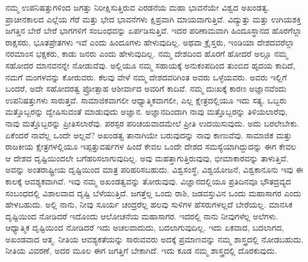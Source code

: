 ನಮ್ಮ ಉಪನಿಷತ್ತುಗಳಿಂದ ಜಗತ್ತು ನಿರೀಕ್ಷಿಸುತ್ತಿರುವ ಎರಡನೆಯ ಮಹಾ ಭಾವನೆಯೇ ವಿಶ್ವದ ಅಖಂಡತ್ವ. ಪ್ರಾಚೀನಕಾಲದ ಎಲ್ಲೆಯ ಗೆರೆ ಮತ್ತು ಭೇದ ಭಾವನೆಗಳು ಕ್ಷಿಪ್ರವಾಗಿ ಮಾಯವಾಗುತ್ತಿವೆ. ವಿದ್ಯುತ್ತು ಮತ್ತು ಉಗಿಯಶಕ್ತಿ ಜಗತ್ತಿನ ಬೇರೆ ಬೇರೆ ಭಾಗಗಳಿಗೆ ಸಂಬಂಧವನ್ನು ಏರ್ಪಡಿಸುತ್ತಿವೆ. ಇದರ ಪರಿಣಾಮವಾಗಿ ಹಿಂದೂಸ್ಥಾನದ ಹೊರಗೆಲ್ಲಾ ರಾಕ್ಷಸರು, ಭೂತಪ್ರೇತಗಳು ಇವೆ ಎಂದು ಹಿಂದೂಗಳು ಹೇಳುವುದಿಲ್ಲ. ಅಥವಾ ಕ್ರೈಸ್ತರು, ಇಂಡಿಯಾ ದೇಶದವರೆಲ್ಲಾ ನರಮಾಂಸ ಭಕ್ಷಕರು, ಕಾಡು ಜನರು ಎಂದು ಹೇಳುವುದಿಲ್ಲ. ನಮ್ಮ ದೇಶದಿಂದ ಹೊರಗೆ ಹೋದರೆ ಅಲ್ಲೂ ನಮ್ಮ ಸಹೋದರ ಮಾನವನನ್ನೇ ನೋಡುವೆವು. ಅಲ್ಲಿಯೂ ನಮ್ಮ ಸಹಾಯಕ್ಕೆ ಅನುಕಂಪದಿಂದ ತುಂಬಿದ ಹೃದಯ ಕಾದಿದೆ, ನಮಗೆ ಮಂಗಳವನ್ನು ಕೋರುವರು. ಕೆಲವು ವೇಳೆ ನಮ್ಮ ದೇಶದವರಿಗಿಂತ ಅವರು ಒಳ್ಳೆಯವರು. ಅವರು ಇಲ್ಲಿಗೆ ಬಂದರೆ, ಅದೇ ಸಹೋದರತ್ವ ಪ್ರೋತ್ಸಾಹ ಆಶೀರ್ವಾದ ಅವರಿಗೆ ಕಾದಿವೆ. ನಮ್ಮ ದುಃಖಕ್ಕೆ ಕಾರಣ ಅಜ್ಞಾನವೆಂದು ಉಪನಿಷತ್ತುಗಳು ಸಾರುತ್ತವೆ. ಸಾಮಾಜಿಕವಾಗಲೀ ಆಧ್ಯಾತ್ಮಿಕವಾಗಲೀ, ಎಲ್ಲ ಕ್ಷೇತ್ರದಲ್ಲಿಯೂ ಇದು ಸತ್ಯ. ಒಬ್ಬರು ಮತ್ತೊಬ್ಬರನ್ನು ದ್ವೇಷಿಸುವಂತೆ ಮಾಡುವುದು ಅಜ್ಞಾನ. ಅಜ್ಞಾನದಿಂದಾಗಿ ನಾವು ಮತ್ತೊಬ್ಬರನ್ನು ತಿಳಿಯಲಾರೆವು, ನಾವು ಮತ್ತೊಬ್ಬರನ್ನು ಪ್ರೀತಿಸಲಾರೆವು. ಪರಸ್ಪರ ಪರಿಚಯವಾದಮೇಲೆ ಪ್ರೀತಿ ಉದಯಿಸುವುದು. ಅದು ಬರಲೇಬೇಕು. ಏಕೆಂದರೆ ನಾವೆಲ್ಲ ಒಂದೇ ಅಲ್ಲವೆ? ಅಖಂಡತ್ವ ತಾನಾಗಿಯೇ ಬರುವುದನ್ನು ನಾವು ಕಾಣುವೆವು. ಸಾಮಾಜಿಕ ಮತ್ತು ರಾಜಕೀಯ ಕ್ಷೇತ್ರಗಳಲ್ಲಿಯೂ ಇಪ್ಪತ್ತು\break ವರ್ಷಗಳ ಹಿಂದೆ ಕೇವಲ ಒಂದೇ ದೇಶದ ಸಮಸ್ಯೆಯಾಗಿದ್ದುದನ್ನು ಈಗ ಕೇವಲ ಆ ದೇಶದ ದೃಷ್ಟಿಯಿಂದಲೇ ಬಗೆಹರಿಸಲಾಗುವುದಿಲ್ಲ. ಅವು ಮಹತ್ತಾಗುತ್ತಿರುವುವು, ಭೀಮಾಕಾರವನ್ನು ತಾಳುತ್ತಿವೆ. ಅವನ್ನು ಅಂತರಾಷ್ಟ್ರೀಯ ದೃಷ್ಟಿಯಿಂದ ಮಾತ್ರ ಪರಿಹರಿಸಬಹುದು. ವಿಶ್ವಸಂಸ್ಥೆ, ವಿಶ್ವಯೋಜನೆ, ವಿಶ್ವಕಾನೂನು ಇವು ಈ ಕಾಲಕ್ಕೆ ಆವಶ್ಯಕವಾಗಿವೆ. ಇವು ನಮ್ಮ ಅಖಂಡತ್ವವನ್ನು ತೋರುವುವು. ವಿಜ್ಞಾನದಲ್ಲಿಯೂ ಪ್ರತಿದಿನವೂ ಭೌತದ್ರವ್ಯದ ಸಂಬಂಧದಲ್ಲಿ ವಿಶಾಲವಾದ ದೃಷ್ಟಿ ಬೆಳೆಯುತ್ತಿದೆ. ಜಗತ್ತೆಲ್ಲ ಒಂದು ರಾಶಿ, ಜಡವಸ್ತುವಿನ ಒಂದು ಮಹಾಸಾಗರ  ಎಂದು ಹೇಳಬಹುದು. ಅಲ್ಲಿ ನಾನು, ನೀವು ಸೂರ್ಯ ಚಂದ್ರರೆಲ್ಲ ಹಲವು ಸುಳಿಗಳ ಹೆಸರುಗಳಲ್ಲದೆ ಬೇರೆಯಲ್ಲ. ಮಾನಸಿಕ ದೃಷ್ಟಿಯಿಂದ ನೋಡಿದರೆ ಇದೊಂದು ಆಲೋಚನೆಯ ಮಹಾಸಾಗರ. ಇದರಲ್ಲಿ ನಾನು ನೀವುಗಳೆಲ್ಲ ಅಲೆಗಳು. ಆಧ್ಯಾತ್ಮಿಕ ದೃಷ್ಟಿಯಿಂದ ನೋಡಿದರೆ ಇದು ಅಚಲವಾದುದು, ಬದಲಾಗುವುದಿಲ್ಲ. ಇದು ಏಕವಾದ, ಬದಲಾಗದ, ಅಖಂಡವಾದ ಆತ್ಮ. ನೀತಿಯ ಆವಶ್ಯಕತೆಯನ್ನು ಸಾರುವವರು ಅದಕ್ಕೆ ಪ್ರಮಾಣವನ್ನು ನಮ್ಮ ಶಾಸ್ತ್ರದಲ್ಲಿ ನೋಡಬಹುದು. ನೀತಿಯ ವಿವರಣೆ, ಅದರ ಮೂಲ ಈಗ ಜಗತ್ತಿಗೆ ಬೇಕಾಗಿದೆ. ಇದು ಕೂಡ ನಮ್ಮ ಶಾಸ್ತ್ರದಲ್ಲಿ ದೊರಕುವುದು.

